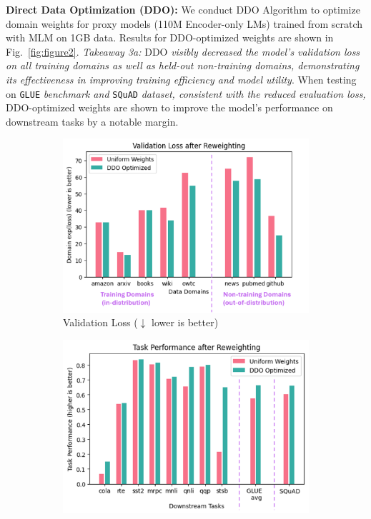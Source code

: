 \documentclass{article} %
\begin{document}
\textbf{Direct Data Optimization (\textsc{DDO}):}
We conduct \textsc{DDO} Algorithm to optimize domain weights for proxy models (110M Encoder-only LMs) trained from scratch with MLM on 1GB data.
Results for \textsc{DDO}-optimized weights are shown in Fig.~\ref{fig:figure2}. \textit{Takeaway 3a:} \textsc{DDO} \textit{visibly decreased the model's validation loss on all training domains as well as held-out non-training domains, demonstrating its effectiveness in improving training efficiency and model utility}. When testing on \texttt{GLUE} \textit{benchmark and} \texttt{SQuAD} \textit{dataset, consistent with the reduced evaluation loss, }\textsc{DDO}-optimized weights are shown to improve the model's performance on downstream tasks by a notable margin.


\begin{figure}[h!]\vspace{-0.5em}
    \centering
    \begin{subfigure}[b]{0.48\textwidth}
        \includegraphics[width=\textwidth]{bertfigs/bert180pr.png}
        \caption{Validation Loss ($\downarrow$ lower is better)}
        \label{fig:figure2a}
    \end{subfigure}
    \begin{subfigure}[b]{0.48\textwidth}
        \includegraphics[width=\textwidth]{bertfigs/glue180pr.png}

\end{subfigure}
\end{figure}
\end{document}
